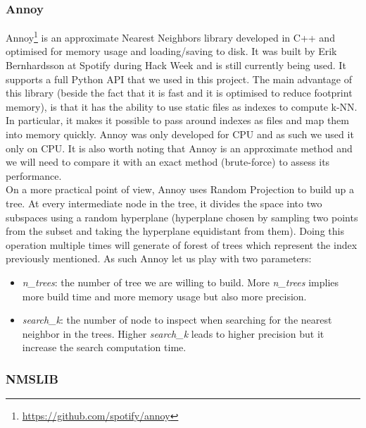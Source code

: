 \documentclass[a4paper]{article}
\begin{document}
\subsubsection{Annoy}

	Annoy\footnote{\url{https://github.com/spotify/annoy}} is an approximate Nearest Neighbors library developed in C++ and optimised for memory usage and loading/saving to disk. It was built by Erik Bernhardsson at Spotify during Hack Week and is still currently being used. It supports a full Python API that we used in this project. The main advantage of this library (beside the fact that it is fast and it is optimised to reduce footprint memory), is that it has the ability to use static files as indexes to compute k-NN. In particular, it makes it possible to pass around indexes as files and map them into memory quickly. Annoy was only developed for CPU and as such we used it only on CPU. It is also worth noting that Annoy is an approximate method and we will need to compare it with an exact method (brute-force) to assess its performance. \\

	On a more practical point of view, Annoy uses Random Projection to build up a tree. At every intermediate node in the tree, it divides the space into two subspaces using a random hyperplane (hyperplane chosen by sampling two points from the subset and taking the hyperplane equidistant from them). Doing this operation multiple times will generate of forest of trees which represent the index previously mentioned. As such Annoy let us play with two parameters:

	\begin{itemize}   
		\item \textit{n\_trees}: the number of tree we are willing to build. More \textit{n\_trees} implies more build time and more memory usage but also more precision.
	
		\item \textit{search\_k}: the number of node to inspect when searching for the nearest neighbor in the trees. Higher \textit{search\_k} leads to higher precision but it increase the search computation time.
	
	\end{itemize}

\subsubsection{NMSLIB}
\end{document}
